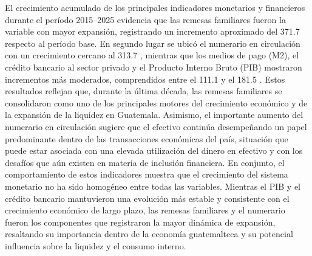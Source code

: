 El crecimiento acumulado de los principales indicadores monetarios y financieros durante el período 2015–2025 evidencia que las remesas familiares fueron la variable con mayor expansión, registrando un incremento aproximado del
371.7%
respecto al período base. En segundo lugar se ubicó el numerario en circulación con un crecimiento cercano al
313.7%
, mientras que los medios de pago (M2), el crédito bancario al sector privado y el Producto Interno Bruto (PIB) mostraron incrementos más moderados, comprendidos entre el
111.1%
y el
181.5%
.
Estos resultados reflejan que, durante la última década, las remesas familiares se consolidaron como uno de los principales motores del crecimiento económico y de la expansión de la liquidez en Guatemala. Asimismo, el importante aumento del numerario en circulación sugiere que el efectivo continúa desempeñando un papel predominante dentro de las transacciones económicas del país, situación que puede estar asociada con una elevada utilización del dinero en efectivo y con los desafíos que aún existen en materia de inclusión financiera.
En conjunto, el comportamiento de estos indicadores muestra que el crecimiento del sistema monetario no ha sido homogéneo entre todas las variables. Mientras el PIB y el crédito bancario mantuvieron una evolución más estable y consistente con el crecimiento económico de largo plazo, las remesas familiares y el numerario fueron los componentes que registraron la mayor dinámica de expansión, resaltando su importancia dentro de la economía guatemalteca y su potencial influencia sobre la liquidez y el consumo interno.